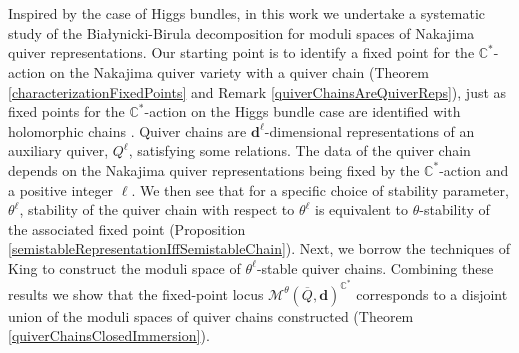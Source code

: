 \documentclass{amsart}
\theoremstyle{plain}
\numberwithin{equation}{section}
\theoremstyle{definition}
\theoremstyle{remark}
\begin{document}
	\\
	\\ 
	Inspired by the case of Higgs bundles, in this work we undertake a systematic study of the Bia\l ynicki-Birula decomposition for moduli spaces of Nakajima quiver representations. Our starting point is to identify a fixed point for the $\mathbb{C}^*$-action on the Nakajima quiver variety with a quiver chain (Theorem \ref{characterizationFixedPoints} and Remark \ref{quiverChainsAreQuiverReps}), just as fixed points for the $\mathbb{C}^*$-action on the Higgs bundle case are identified with holomorphic chains \cite{AlvarezCGarciaPDimensionalReduction}. Quiver chains are $\mathbf{d}^\ell$-dimensional representations of an auxiliary quiver, $Q^\ell$, satisfying some relations. The data of the quiver chain depends on the Nakajima quiver representations being fixed by the $\mathbb{C}^*$-action and a positive integer $\ell$. We then see that for a specific choice of stability parameter, $\theta^\ell$, stability of the quiver chain with respect to $\theta^\ell$ is equivalent to $\theta$-stability of the associated fixed point (Proposition \ref{semistableRepresentationIffSemistableChain}). Next, we borrow the techniques of King \cite{KingModuli} to construct the moduli space of $\theta^\ell$-stable quiver chains. Combining these results we show that the fixed-point locus $\mathcal{M}^\theta(\overline{Q},\mathbf{d})^{\mathbb{C}^*}$ corresponds to a disjoint union of the moduli spaces of quiver chains constructed (Theorem \ref{quiverChainsClosedImmersion}). 
	\\
	\\
\end{document}
